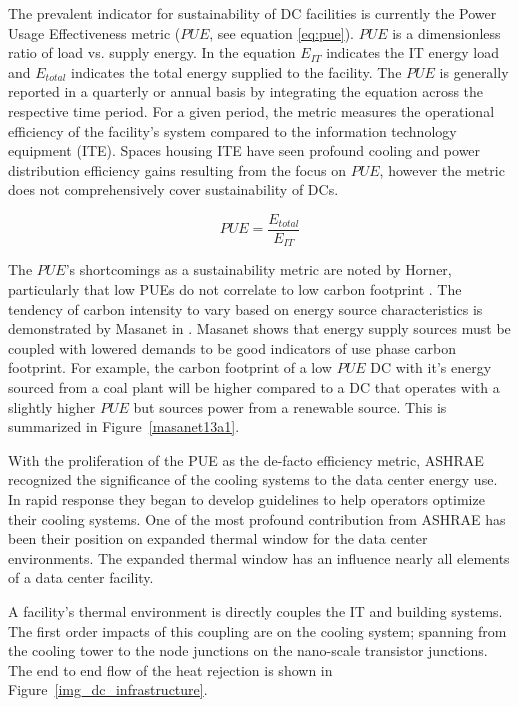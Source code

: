     The prevalent indicator for sustainability of DC facilities is currently the Power Usage Effectiveness metric ($PUE$, see equation \ref{eq:pue}). $PUE$ is a dimensionless ratio of load vs. supply energy.   In the equation $E_{IT}$ indicates the IT energy load and $E_{total}$ indicates the total energy supplied to the facility. The $PUE$ is generally reported in a quarterly or annual basis by integrating the equation across the respective time period. For a given period, the metric measures the operational efficiency of the facility's system compared to the information technology equipment (ITE). Spaces housing ITE have seen profound cooling and power distribution efficiency gains resulting from the focus on $PUE$, however the metric does not comprehensively cover sustainability of DCs.
    
    \begin{equation} \label{eq:pue}
    PUE=\frac{E_{total}}{E_{IT}} 
    \end{equation}
    
    The $PUE$'s shortcomings as a sustainability metric are noted by Horner, particularly that low PUEs do not correlate to low carbon footprint \cite{Horner16a}. The tendency of carbon intensity to vary based on energy source characteristics is demonstrated by Masanet in \cite{Masanet13a}. Masanet shows that energy supply sources must be coupled with lowered demands to be good indicators of use phase carbon footprint. For example, the carbon footprint of a low $PUE$ DC with it's energy sourced from a coal plant will be higher compared to a DC that operates with a slightly higher $PUE$ but sources power from a renewable source. This is summarized in Figure~\ref{masanet13a1}.
    
    
    
    With the proliferation of the PUE as the de-facto efficiency metric, ASHRAE recognized the significance of the cooling systems to the data center energy use. In rapid response they began to develop guidelines to help operators optimize their cooling systems. One of the most profound contribution from ASHRAE has been their position on expanded thermal window for the data center environments. The expanded thermal window has an influence nearly all elements of a data center facility. 
    
    
    
    A facility's thermal environment is directly couples the IT and building systems. The first order impacts of this coupling are on the cooling system; spanning from the cooling tower to the node junctions on the nano-scale transistor junctions. The end to end flow of the heat rejection is shown in Figure~\ref{img_dc_infrastructure}. 
    
